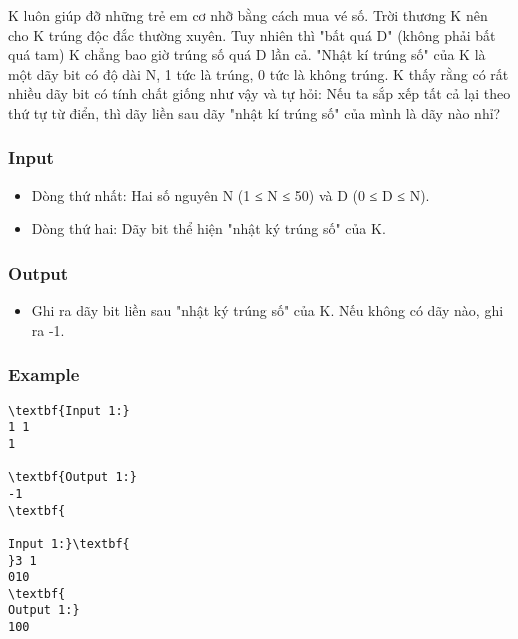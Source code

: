 

K luôn giúp đỡ những trẻ em cơ nhỡ bằng cách mua vé số. Trời thương K  nên cho K trúng độc đắc thường xuyên. Tuy nhiên thì "bất quá D" (không  phải bất quá tam) K chẳng bao giờ trúng số quá D lần cả. "Nhật kí trúng  số" của K là một dãy bit có độ dài N, 1 tức là trúng, 0 tức là không  trúng. K thấy rằng có rất nhiều dãy bit có tính chất giống như vậy và tự  hỏi: Nếu ta sắp xếp tất cả lại theo thứ tự từ điển, thì dãy liền sau  dãy "nhật kí trúng số" của mình là dãy nào nhỉ?

\subsubsection{Input}
\begin{itemize}
	\item Dòng thứ nhất: Hai số nguyên N (1 ≤ N ≤ 50) và D (0 ≤ D ≤ N).
	\item Dòng thứ hai: Dãy bit thể hiện "nhật ký trúng số" của K.
\end{itemize}

\subsubsection{Output}
\begin{itemize}
	\item Ghi ra dãy bit liền sau "nhật ký trúng số" của K. Nếu không có dãy nào, ghi ra -1.
\end{itemize}

\subsubsection{Example}
\begin{verbatim}
\textbf{Input 1:}
1 1
1

\textbf{Output 1:}
-1
\textbf{

Input 1:}\textbf{
}3 1
010
\textbf{
Output 1:}
100
\end{verbatim}
